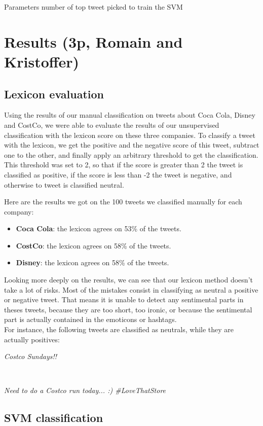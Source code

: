 \documentclass[a4paper,11pt]{report}
\begin{document}
Parameters
number of top tweet picked to train the SVM



\chapter{Results (3p, Romain and Kristoffer)}

\section{Lexicon evaluation}

Using the results of our manual classification on tweets about Coca Cola, Disney and CostCo, we were able to evaluate the results of our unsupervised classification with the lexicon score on these three companies.
To classify a tweet with the lexicon, we get the positive and the negative score of this tweet, subtract one to the other, and finally apply an arbitrary threshold to get the classification.
This threshold was set to 2, so that if the score is greater than 2 the tweet is classified as positive, if the score is less than -2 the tweet is negative, and otherwise to tweet is classified neutral.

Here are the results we got on the 100 tweets we classified manually for each company:
\begin{itemize}
        \item \textbf{Coca Cola}: the lexicon agrees on 53\% of the tweets.
        \item \textbf{CostCo}: the lexicon agrees on 58\% of the tweets.
        \item \textbf{Disney}: the lexicon agrees on 58\% of the tweets.
\end{itemize}
Looking more deeply on the results, we can see that our lexicon method doesn't take a lot of risks.
Most of the mistakes consist in classifying as neutral a positive or negative tweet. That means it is unable to detect any sentimental parts in theses tweets, because they are too short, too ironic, or because the sentimental part is actually contained in the emoticons or hashtags.\\
For instance, the following tweets are classified as neutrals, while they are actually positives:\\
\centerline{\textit{Costco Sundays!!}}\\
\centerline{\textit{Need to do a Costco run today... :) \#LoveThatStore}}

\section{SVM classification}
\end{document}
